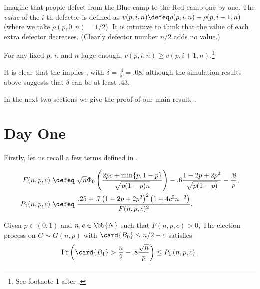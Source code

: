 \documentclass{toc}
\begin{document}
			Imagine that people defect from
			the  %
			Blue camp to
			the  %
			Red camp one by one. The \emph{value} of the
			$i$-th  %
			defector is defined as $v(p, i,n) \defeq \rho (p, i,n) - \rho (p, i-1, n)$ (where we take $\rho (p, 0, n) = 1/2 $). It is intuitive to think that the value of each extra defector decreases. (Clearly defector number $n/2$ adds no value.)
			
			\begin{conjecture} \label{conj:defectors}
				For any fixed $p$, $i$, and $n$ large enough, $v(p, i,n) \ge v(p, i+1, n)$.\footnote[2]{See footnote 1 after .}
			\end{conjecture}
			
			
			It is clear that the  implies , with $\delta = \frac{.4}{5} =.08 $, although the simulation results above suggests that $\delta$ can be at least $.43$.
			
			In the next two sections we give the proof of our main result, .
			
			
			\section{Day One} \label{sec:firstday-const}
			
			
			Firstly, let us recall a few terms defined in .
			\begin{linenomath}\begin{equation*}
					\begin{aligned}
						F(n, p, c) & \ \defeq \ \sqrt{n}\Phi_0\left(\frac{2pc  %
							+ \min\{p, 1 - p\}  %
						}{\sqrt{p(1 - p)n}} \right) - .6\frac{1 - 2p + 2p^2}{\sqrt{p(1 - p)}} - \frac{.8}{p}, \\
						P_1(n, p, c) & \ \defeq \ \frac{.25 + .7\left(1 - 2p + 2p^2\right)^2 \left(1 + 4c^2n^{-2}\right)}
						{F(n, p, c)^2}.
					\end{aligned}
			\end{equation*}\end{linenomath}
			
			\begin{lemma} \label{lem:const-advantage-day-1}
				Given $p \in (0, 1)$ and $n, c\in \bb{N}$ such that 
				$F(n, p, c)  > 0$,
				The election process on $G\sim G(n, p)$ with $\card{B_0}\le n/2 - c$ satisfies
				\[ \label{eq:const-advantage-day-1}
				\Pr \left(\card{B_1} > \frac{n}{2} - .8\frac{\sqrt{n}}{p}\right) \le P_1\left(n, p, c\right).
				\]
			\end{lemma}
			
\end{document}
